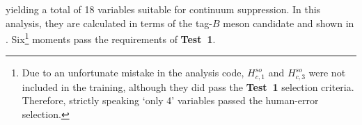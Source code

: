 yielding a total of 18 variables suitable for continuum suppression.
In this analysis, they are calculated in terms of the tag-$B$ meson candidate and shown in
.
Six\footnote[1]{Due to an unfortunate mistake in the analysis code, $H_{c,1}^{so}$ and $H_{c,3}^{so}$ were not included in the \BDT training, although they did pass the \textbf{Test~1} selection criteria.
Therefore, strictly speaking `only 4' variables passed the human-error selection.
}
moments pass the requirements of \textbf{Test~1}.

